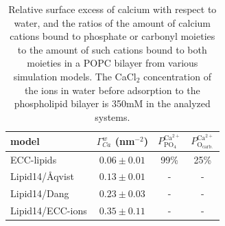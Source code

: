 \documentclass[aip,jcp,twocolumn]{revtex4}
\begin{document}
\begin{table}[tb!]
  \caption{Relative surface excess of calcium with respect to water, 
  and the ratios of the amount of calcium cations 
  bound to phosphate or carbonyl moieties 
  to the amount of such cations bound to both moieties in a POPC bilayer 
  from various simulation models. 
  The CaCl$_2$ concentration of the ions in water before adsorption to the phospholipid bilayer
  is 350mM in the analyzed systems. \label{tab:binding}}
  \begin{tabular}{l|c c c}
    model                 & $\Gamma_{Ca}^w$ (nm$^{-2}$)   & $P^\mathrm{Ca^{2+}} _\mathrm{PO_4} $ & $P^\mathrm{Ca^{2+}} _\mathrm{O_{carb.}} $ \\
    \hline
    ECC-lipids            &  $0.06 \pm 0.01 $            &  99\%   &    25\%    \\
    Lipid14/\AA{}qvist    &  $0.13 \pm 0.01 $            &  -       &     -       \\
    Lipid14/Dang          &  $0.23 \pm 0.03 $            &  -        &    -       \\
    Lipid14/ECC-ions      &  $0.35 \pm 0.11 $            &  -        &    -       \\
  \end{tabular}
\end{table}
\end{document}
